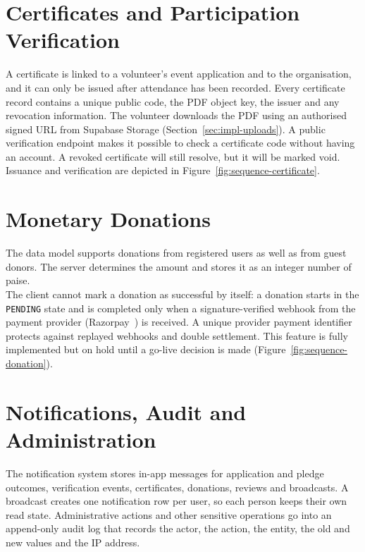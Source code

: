 \section{Certificates and Participation Verification}
\label{sec:impl-certificates}
A certificate is linked to a volunteer's event application and to the organisation, and it can only be issued after attendance has been recorded. Every certificate record contains a unique public code, the PDF object key, the issuer and any revocation information. The volunteer downloads the PDF using an authorised signed URL from Supabase Storage (Section~\ref{sec:impl-uploads}). A public verification endpoint makes it possible to check a certificate code without having an account. A revoked certificate will still resolve, but it will be marked void. Issuance and verification are depicted in Figure~\ref{fig:sequence-certificate}.


\section{Monetary Donations}
\label{sec:impl-donations}
The data model supports donations from registered users as well as from guest donors. The server determines the amount and stores it as an integer number of paise. \\ The client cannot mark a donation as successful by itself: a donation starts in the \texttt{PENDING} state and is completed only when a signature-verified webhook from the payment provider (Razorpay~\cite{razorpay}) is received. A unique provider payment identifier protects against replayed webhooks and double settlement. This feature is fully implemented but on hold until a go-live decision is made (Figure~\ref{fig:sequence-donation}).


\section{Notifications, Audit and Administration}
\label{sec:impl-notifications}
The notification system stores in-app messages for application and pledge outcomes, verification events, certificates, donations, reviews and broadcasts. A broadcast creates one notification row per user, so each person keeps their own read state. Administrative actions and other sensitive operations go into an append-only audit log that records the actor, the action, the entity, the old and new values and the IP address.

